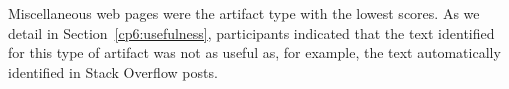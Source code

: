 Miscellaneous web pages were the artifact type with the lowest scores. As we detail in Section~\ref{cp6:usefulness},
participants indicated that the text identified for this type of artifact was not as useful as, for example, the text 
automatically identified in Stack Overflow posts.










